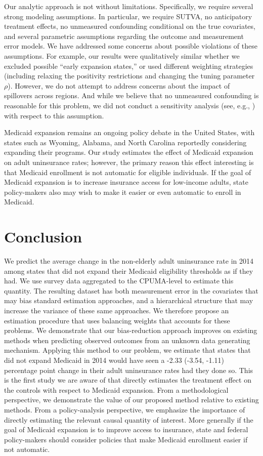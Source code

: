 \documentclass[aoas]{imsart}
\theoremstyle{plain}
\theoremstyle{remark}
\begin{document}
Our analytic approach is not without limitations. Specifically, we require several strong modeling assumptions. In particular, we require SUTVA, no anticipatory treatment effects, no unmeasured confounding conditional on the true covariates, and several parametric assumptions regarding the outcome and measurement error models. We have addressed some concerns about possible violations of these assumptions. For example, our results were qualitatively similar whether we excluded possible ``early expansion states,'' or used different weighting strategies (including relaxing the positivity restrictions and changing the tuning parameter $\rho$). However, we do not attempt to address concerns about the impact of spillovers across regions. And while we believe that no unmeasured confounding is reasonable for this problem, we did not conduct a sensitivity analysis (see, e.g., \cite{bonvini2021sensitivity}) with respect to this assumption. 

Medicaid expansion remains an ongoing policy debate in the United States, with states such as Wyoming, Alabama, and North Carolina reportedly considering expanding their programs. Our study estimates the effect of Medicaid expansion on adult uninsurance rates; however, the primary reason this effect interesting is that Medicaid enrollment is not automatic for eligible individuals. If the goal of Medicaid expansion is to increase insurance access for low-income adults, state policy-makers also may wish to make it easier or even automatic to enroll in Medicaid. 

\section{Conclusion}

We predict the average change in the non-elderly adult uninsurance rate in 2014 among states that did not expand their Medicaid eligibility thresholds as if they had. We use survey data aggregated to the CPUMA-level to estimate this quantity. The resulting dataset has both measurement error in the covariates that may bias standard estimation approaches, and a hierarchical structure that may increase the variance of these same approaches. We therefore propose an estimation procedure that uses balancing weights that accounts for these problems. We demonstrate that our bias-reduction approach improves on existing methods when predicting observed outcomes from an unknown data generating mechanism. Applying this method to our problem, we estimate that states that did not expand Medicaid in 2014 would have seen a -2.33 (-3.54, -1.11) percentage point change in their adult uninsurance rates had they done so. This is the first study we are aware of that directly estimates the treatment effect on the controls with respect to Medicaid expansion. From a methodological perspective, we demonstrate the value of our proposed method relative to existing methods. From a policy-analysis perspective, we emphasize the importance of directly estimating the relevant causal quantity of interest. More generally if the goal of Medicaid expansion is to improve access to insurance, state and federal policy-makers should consider policies that make Medicaid enrollment easier if not automatic.
\end{document}
